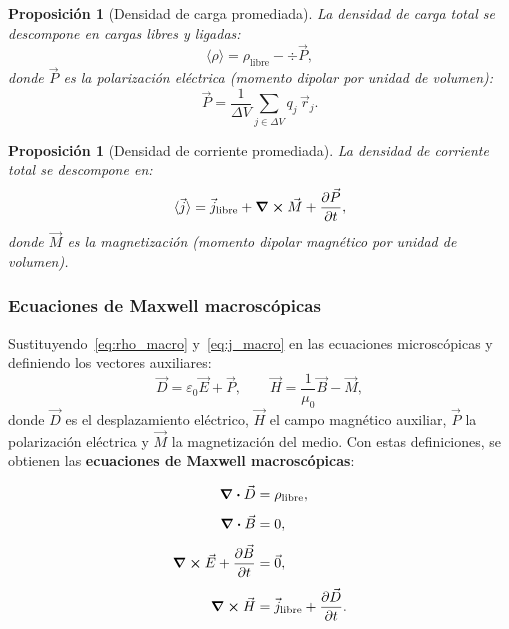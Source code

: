 \documentclass[12pt, a4paper]{article}
\theoremstyle{plain}
\newtheorem{proposicion}[teorema]{Proposición}
\theoremstyle{definition}
\theoremstyle{remark}
\newcommand{\ve}[1]{\vec{#1}}
\begin{document}
\begin{proposicion}[Densidad de carga promediada]
La densidad de carga total se descompone en cargas libres y ligadas:
\begin{equation}
  \langle\rho\rangle = \rho_\text{libre} - \div\ve{P}, \label{eq:rho_macro}
\end{equation}
donde $\ve{P}$ es la \emph{polarización eléctrica} (momento dipolar por
unidad de volumen):
\begin{equation}
  \ve{P} = \frac{1}{\Delta V}\sum_{j\in\Delta V} q_j\,\ve{r}_j.
  \label{eq:polarizacion}
\end{equation}
\end{proposicion}

\begin{proposicion}[Densidad de corriente promediada]
La densidad de corriente total se descompone en:
\begin{equation}
  \langle\ve{j}\rangle = \ve{j}_\text{libre}
  + \curl\ve{M} + \pdv{\ve{P}}{t}, \label{eq:j_macro}
\end{equation}
donde $\ve{M}$ es la \emph{magnetización} (momento dipolar magnético por
unidad de volumen).
\end{proposicion}

\subsubsection{Ecuaciones de Maxwell macroscópicas}

Sustituyendo~\eqref{eq:rho_macro} y~\eqref{eq:j_macro} en las ecuaciones
microscópicas y definiendo los vectores auxiliares:
\begin{equation}
  \ve{D} = \varepsilon_0\ve{E} + \ve{P}, \qquad
  \ve{H} = \frac{1}{\mu_0}\ve{B} - \ve{M}, \label{eq:DH}
\end{equation}
donde $\ve{D}$ es el desplazamiento eléctrico, $\ve{H}$ el campo magnético
auxiliar, $\ve{P}$ la polarización eléctrica y $\ve{M}$ la magnetización del
medio. Con estas definiciones,
se obtienen las \textbf{ecuaciones de Maxwell macroscópicas}:

\begin{mdframed}[style=resultado]
\begin{align}
  \div\ve{D} &= \rho_\text{libre}, \label{eq:maxmat1}\\[4pt]
  \div\ve{B} &= 0, \label{eq:maxmat2}\\[4pt]
  \curl\ve{E} + \pdv{\ve{B}}{t} &= \ve{0}, \label{eq:maxmat3}\\[4pt]
  \curl\ve{H} &= \ve{j}_\text{libre} + \pdv{\ve{D}}{t}. \label{eq:maxmat4}
\end{align}
\end{mdframed}
\end{document}
